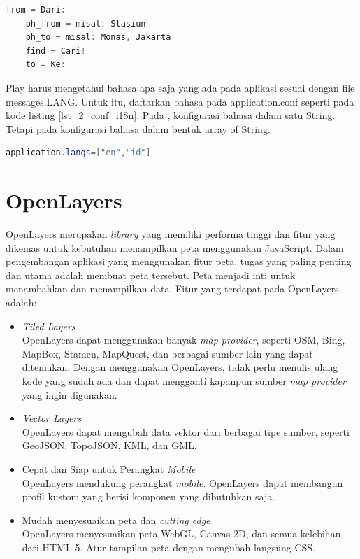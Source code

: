 \begin{lstlisting}[caption=Contoh messages.id untuk i18n,label = {lst_2_i18n_id},language=Java]
	from = Dari:
	ph_from = misal: Stasiun
	ph_to = misal: Monas, Jakarta
	find = Cari!
	to = Ke:
\end{lstlisting}

Play harus mengetahui bahasa apa saja yang ada pada aplikasi sesuai dengan file messages.LANG. Untuk itu, daftarkan bahasa pada application.conf seperti pada kode listing \ref{lst_2_conf_i18n}. Pada \cite{playforjava}, konfigurasi bahasa dalam satu String. Tetapi pada  konfigurasi bahasa dalam bentuk array of String.

\begin{lstlisting}[caption=Konfigurasi Bahasa i18n,label = {lst_2_conf_i18n},language=Java]
	application.langs=["en","id"]
\end{lstlisting}


	
	
\section{OpenLayers}
\label{sec:openlayers}
OpenLayers \cite{openlayersbook} merupakan \textit{library} yang memiliki performa tinggi dan fitur yang dikemas untuk kebutuhan menampilkan peta menggunakan JavaScript. Dalam pengembangan aplikasi yang menggunakan fitur peta, tugas yang paling penting dan utama adalah membuat peta tersebut. Peta menjadi inti untuk menambahkan dan menampilkan data. Fitur yang terdapat pada OpenLayers adalah:

\begin{itemize}
\item \textit{Tiled Layers}\\
			OpenLayers dapat menggunakan banyak \textit{map provider}, seperti OSM, Bing, MapBox, Stamen, MapQuest, dan berbagai sumber lain yang dapat ditemukan. Dengan menggunakan OpenLayers, tidak perlu menulis ulang kode yang sudah ada dan dapat mengganti kapanpun sumber \textit{map provider} yang ingin digunakan.
	\item \textit{Vector Layers}\\
			OpenLayers dapat mengubah data vektor dari berbagai tipe sumber, seperti GeoJSON, TopoJSON, KML, dan GML.
	\item Cepat dan Siap untuk Perangkat \textit{Mobile}\\
			OpenLayers mendukung perangkat \textit{mobile}. OpenLayers dapat membangun profil kustom yang berisi komponen yang dibutuhkan saja.
	\item Mudah menyesuaikan peta dan \textit{cutting edge}\\
			OpenLayers menyesuaikan peta WebGL, Canvas 2D, dan semua kelebihan dari HTML 5. Atur tampilan peta dengan mengubah langsung CSS.
\end{itemize}


